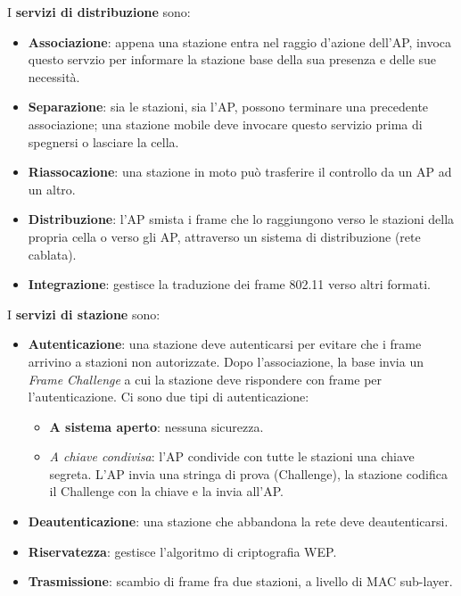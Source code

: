             I \textbf{servizi di distribuzione} sono:
            \begin{itemize}
                \item \textbf{Associazione}: appena una stazione entra nel raggio d'azione dell'AP, invoca questo servzio per informare la stazione base della sua presenza e delle sue necessità.
                \item \textbf{Separazione}: sia le stazioni, sia l'AP, possono terminare una precedente associazione; una stazione mobile deve invocare questo servizio prima di spegnersi o lasciare la cella.
                \item \textbf{Riassocazione}: una stazione in moto può trasferire il controllo da un AP ad un altro.
                \item \textbf{Distribuzione}: l'AP smista i frame che lo raggiungono verso le stazioni della propria cella o verso gli AP, attraverso un sistema di distribuzione (rete cablata).
                \item \textbf{Integrazione}: gestisce la traduzione dei frame 802.11 verso altri formati.
            \end{itemize}

            I \textbf{servizi di stazione} sono:
            \begin{itemize}
                \item \textbf{Autenticazione}: una stazione deve autenticarsi per evitare che i frame arrivino a stazioni non autorizzate. Dopo l'associazione, la base invia un \textit{Frame Challenge} a cui la stazione deve rispondere con frame per l'autenticazione.
                Ci sono due tipi di autenticazione:
                \begin{itemize}
                    \item \textbf{A sistema aperto}: nessuna sicurezza.
                    \item \textit{A chiave condivisa}: l'AP condivide con tutte le stazioni una chiave segreta. L'AP invia una stringa di prova (Challenge), la stazione codifica il Challenge con la chiave e la invia all'AP.
                \end{itemize}
                \item \textbf{Deautenticazione}: una stazione che abbandona la rete deve deautenticarsi.
                \item \textbf{Riservatezza}: gestisce l'algoritmo di criptografia WEP.
                \item \textbf{Trasmissione}: scambio di frame fra due stazioni, a livello di MAC sub-layer.
            \end{itemize}

